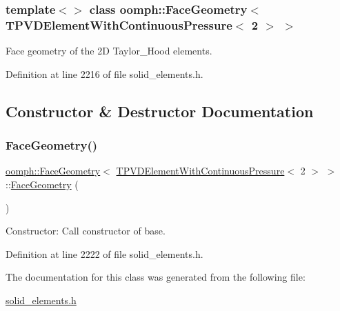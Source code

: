 \subsubsection*{template$<$$>$\newline
class oomph\+::\+Face\+Geometry$<$ T\+P\+V\+D\+Element\+With\+Continuous\+Pressure$<$ 2 $>$ $>$}

Face geometry of the 2D Taylor\+\_\+\+Hood elements. 

Definition at line 2216 of file solid\+\_\+elements.\+h.



\subsection{Constructor \& Destructor Documentation}
\mbox{\label{classoomph_1_1FaceGeometry_3_01TPVDElementWithContinuousPressure_3_012_01_4_01_4_a2f239ef2e6e8fdf3b6573a05d30147b2}} 
\subsubsection{\texorpdfstring{Face\+Geometry()}{FaceGeometry()}}
{\footnotesize\ttfamily \hyperlink{classoomph_1_1FaceGeometry}{oomph\+::\+Face\+Geometry}$<$ \hyperlink{classoomph_1_1TPVDElementWithContinuousPressure}{T\+P\+V\+D\+Element\+With\+Continuous\+Pressure}$<$ 2 $>$ $>$\+::\hyperlink{classoomph_1_1FaceGeometry}{Face\+Geometry} (\begin{DoxyParamCaption}{ }\end{DoxyParamCaption})\hspace{0.3cm}{\ttfamily [inline]}}



Constructor\+: Call constructor of base. 



Definition at line 2222 of file solid\+\_\+elements.\+h.



The documentation for this class was generated from the following file\+:\begin{DoxyCompactItemize}
\item 
\hyperlink{solid__elements_8h}{solid\+\_\+elements.\+h}\end{DoxyCompactItemize}
